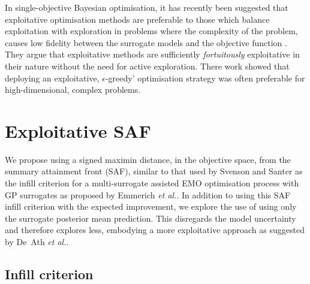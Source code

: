 \documentclass[conference]{IEEEtran}
\makeatletter
\newcommand\gp{GP\xspace}
\newcommand\maximin{maximin\xspace}
\newcommand*{\etal}{\textit{et al.}\@\xspace}
\makeatother
\begin{document}
In single-objective Bayesian optimisation, it has recently been suggested that exploitative optimisation methods are preferable to those which balance exploitation with exploration in problems where the complexity of the problem, causes low fidelity between the surrogate models and the objective function \cite{death2019greed}. They argue that exploitative methods are sufficiently \textit{fortuitously} exploitative in their nature without the need for active exploration. There work showed that deploying an exploitative, $\epsilon$-greedy' optimisation strategy was often preferable for high-dimensional, complex problems.


\section{Exploitative SAF}\label{section:our_method}
We propose using a signed \maximin distance, in the objective space, from
the summary attainment front (SAF), similar to that used by Svenson and
Santer \cite{svenson2016multiobjective} as the infill criterion for a
multi-surrogate assisted EMO optimisation process with \gp surrogates as
proposed by Emmerich \etal \cite{emmerich2006single}.   In addition to
using this SAF infill criterion with the expected improvement, we explore the use of using only the surrogate posterior mean prediction. This disregards the model uncertainty and therefore explores less, embodying  a more exploitative approach  as suggested by De~Ath \etal \cite{death2019greed}. 


\subsection{Infill criterion}\label{section: infill_criterion}
\end{document}
